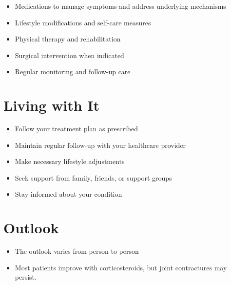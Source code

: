 \begin{itemize}[noitemsep]
  \item Medications to manage symptoms and address underlying mechanisms
  \item Lifestyle modifications and self-care measures
  \item Physical therapy and rehabilitation
  \item Surgical intervention when indicated
  \item Regular monitoring and follow-up care
\end{itemize}
\section{Living with It}
\begin{itemize}[noitemsep]
  \item Follow your treatment plan as prescribed
  \item Maintain regular follow-up with your healthcare provider
  \item Make necessary lifestyle adjustments
  \item Seek support from family, friends, or support groups
  \item Stay informed about your condition
\end{itemize}
\section{Outlook}
\begin{itemize}[noitemsep]
  \item The outlook varies from person to person
  \item Most patients improve with corticosteroids, but joint contractures may persist.
\end{itemize}
